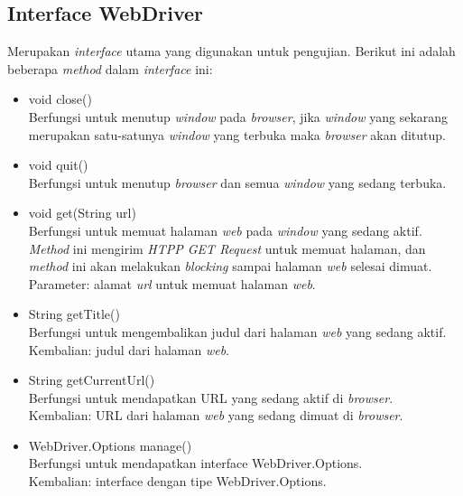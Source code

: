 \subsection{Interface WebDriver}
\label{subsec:webdriver}
Merupakan \textit{interface} utama yang digunakan untuk pengujian. Berikut ini adalah beberapa \textit{method} dalam \textit{interface} ini:
\begin{itemize}
\item void close()\\
Berfungsi untuk menutup \textit{window} pada \textit{browser}, jika \textit{window} yang sekarang merupakan satu-satunya \textit{window} yang terbuka maka \textit{browser} akan ditutup.
\item void quit()\\
Berfungsi untuk menutup \textit{browser} dan semua \textit{window} yang sedang terbuka.
\item void get(String url)\\
Berfungsi untuk memuat halaman \textit{web} pada \textit{window} yang sedang aktif. \textit{Method} ini mengirim \textit{HTPP GET Request} untuk memuat halaman, dan \textit{method} ini akan melakukan \textit{blocking} sampai halaman \textit{web} selesai dimuat.\\
Parameter: alamat \textit{url} untuk memuat halaman \textit{web}.
\item String getTitle()\\
Berfungsi untuk mengembalikan judul dari halaman \textit{web} yang sedang aktif.\\
Kembalian: judul dari halaman \textit{web}.
\item String getCurrentUrl()\\
Berfungsi untuk mendapatkan URL yang sedang aktif di \textit{browser}.\\
Kembalian: URL dari halaman \textit{web} yang sedang dimuat di \textit{browser}.

\item WebDriver.Options manage()\\
Berfungsi untuk mendapatkan interface WebDriver.Options.\\
Kembalian: interface dengan tipe WebDriver.Options.  
\end{itemize}

